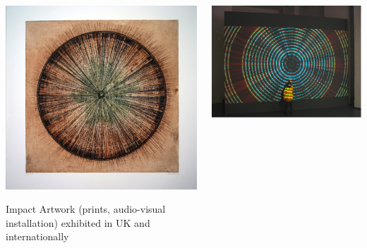 \begin{frame}
\begin{columns}[T]
\begin{column}{3.5cm}
      \includegraphics[height=0.4\textheight]{images/shemilt-fig3} \\
        \begin{tiny}        
          \begin{alertblock}{Impact}
            Artwork (prints, audio-visual installation) exhibited in UK and internationally
          \end{alertblock}                
        \end{tiny}                        
    \end{column}
    \begin{column}{3.5cm}  
      \includegraphics[width=1\textwidth]{images/sciart2} \\

\end{column}
\end{columns}
\end{frame}
